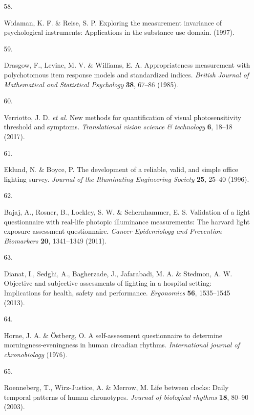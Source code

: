 \documentclass[
  man]{apa6}
\newlength{\cslhangindent}
\newlength{\csllabelwidth}
\newlength{\cslentryspacingunit} %
\newenvironment{CSLReferences}[2] %
 {%
  \setlength{\parindent}{0pt}
  \ifodd #1
  \let\oldpar\par
  \def\par{\hangindent=\cslhangindent\oldpar}
  \fi
  \setlength{\parskip}{#2\cslentryspacingunit}
 }%
 {}
\newcommand{\CSLLeftMargin}[1]{\parbox[t]{\csllabelwidth}{#1}}
\newcommand{\CSLRightInline}[1]{\parbox[t]{\linewidth - \csllabelwidth}{#1}\break}
\begin{document}
\begin{CSLReferences}{0}{0}
\leavevmode{}%
\CSLLeftMargin{58. }%
\CSLRightInline{Widaman, K. F. \& Reise, S. P. Exploring the measurement invariance of psychological instruments: Applications in the substance use domain. (1997).}

\leavevmode{}%
\CSLLeftMargin{59. }%
\CSLRightInline{Drasgow, F., Levine, M. V. \& Williams, E. A. Appropriateness measurement with polychotomous item response models and standardized indices. \emph{British Journal of Mathematical and Statistical Psychology} \textbf{38}, 67--86 (1985).}

\leavevmode{}%
\CSLLeftMargin{60. }%
\CSLRightInline{Verriotto, J. D. \emph{et al.} New methods for quantification of visual photosensitivity threshold and symptoms. \emph{Translational vision science \& technology} \textbf{6}, 18--18 (2017).}

\leavevmode{}%
\CSLLeftMargin{61. }%
\CSLRightInline{Eklund, N. \& Boyce, P. The development of a reliable, valid, and simple office lighting survey. \emph{Journal of the Illuminating Engineering Society} \textbf{25}, 25--40 (1996).}

\leavevmode{}%
\CSLLeftMargin{62. }%
\CSLRightInline{Bajaj, A., Rosner, B., Lockley, S. W. \& Schernhammer, E. S. Validation of a light questionnaire with real-life photopic illuminance measurements: The harvard light exposure assessment questionnaire. \emph{Cancer Epidemiology and Prevention Biomarkers} \textbf{20}, 1341--1349 (2011).}

\leavevmode{}%
\CSLLeftMargin{63. }%
\CSLRightInline{Dianat, I., Sedghi, A., Bagherzade, J., Jafarabadi, M. A. \& Stedmon, A. W. Objective and subjective assessments of lighting in a hospital setting: Implications for health, safety and performance. \emph{Ergonomics} \textbf{56}, 1535--1545 (2013).}

\leavevmode{}%
\CSLLeftMargin{64. }%
\CSLRightInline{Horne, J. A. \& Östberg, O. A self-assessment questionnaire to determine morningness-eveningness in human circadian rhythms. \emph{International journal of chronobiology} (1976).}

\leavevmode{}%
\CSLLeftMargin{65. }%
\CSLRightInline{Roenneberg, T., Wirz-Justice, A. \& Merrow, M. Life between clocks: Daily temporal patterns of human chronotypes. \emph{Journal of biological rhythms} \textbf{18}, 80--90 (2003).}


\end{CSLReferences}
\end{document}
